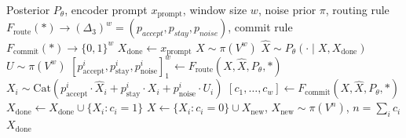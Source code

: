\begin{algorithm}[tb]
\caption{Generic Diffusion Sampler}
\label{alg:gen-adapt}
\begin{algorithmic}[1]
\Require Posterior $P_\theta$, encoder prompt $x_{\mathrm{prompt}}$, window size $w$, noise prior $\pi$, routing rule $F_{\mathrm{route}}(*) \to (\Delta_{3})^w = (p_{accept}, p_{stay}, p_{noise})$, commit rule $F_{\mathrm{commit}}(*) \to \{0, 1\}^w$
\State $X_{\mathrm{done}} \gets x_{\mathrm{prompt}}$
\State $X \sim \pi(V^w)$
    \State $\hat{X} \sim P_{\theta}(\cdot \mid X, X_{\mathrm{done}})$
    \State $U \sim \pi(V^w)$
    \State $[p_{\mathrm{accept}}^i, p_{\mathrm{stay}}^i, p_{\mathrm{noise}}^i]_1^w \gets F_{\mathrm{route}}(X, \hat{X}, P_{\theta}, *)$
    \State $X_i \sim \text{Cat} \left( p_{\mathrm{accept}}^i \cdot \hat{X}_i + p_{\mathrm{stay}}^i \cdot X_i + p_{\mathrm{noise}}^i \cdot U_i \right)$
    \State $[c_1, \dots, c_w] \gets F_{\mathrm{commit}}(X, \hat{X}, P_{\theta}, *)$ 
    \State $X_{\mathrm{done}} \gets X_{\mathrm{done}} \cup \{X_{i} : c_i = 1\}$ 
    \State $X \gets \{X_{i}: c_i = 0 \} \cup X_{\mathrm{new}}$, $X_{\mathrm{new}} \sim \pi(V^{n})$, $n = \sum_i c_i$ 
\EndWhile
\State \Return $X_{\mathrm{done}}$
\end{algorithmic}
\end{algorithm}
